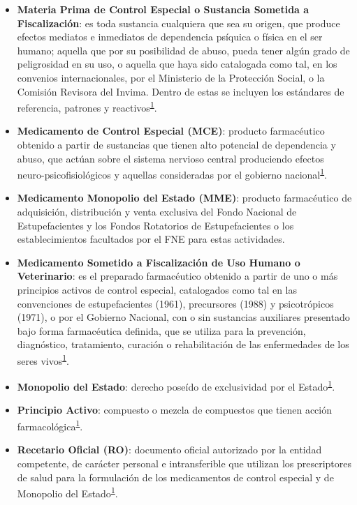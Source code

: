 \documentclass[
]{book}
\begin{document}
\begin{itemize}
\item
  \textbf{Materia Prima de Control Especial o Sustancia Sometida a Fiscalización}: es toda sustancia cualquiera que sea su origen, que produce efectos mediatos e inmediatos de dependencia psíquica o física en el ser humano; aquella que por su posibilidad de abuso, pueda tener algún grado de peligrosidad en su uso, o aquella que haya sido catalogada como tal, en los convenios internacionales, por el Ministerio de la Protección Social, o la Comisión Revisora del Invima. Dentro de estas se incluyen los estándares de referencia, patrones y reactivos\textsuperscript{\protect\hyperlink{ref-MSPS1478-2006}{1}}.
\item
  \textbf{Medicamento de Control Especial (MCE)}: producto farmacéutico obtenido a partir de sustancias que tienen alto potencial de dependencia y abuso, que actúan sobre el sistema nervioso central produciendo efectos neuro-psicofisiológicos y aquellas consideradas por el gobierno nacional\textsuperscript{\protect\hyperlink{ref-MSPS1478-2006}{1}}.
\item
  \textbf{Medicamento Monopolio del Estado (MME)}: producto farmacéutico de adquisición, distribución y venta exclusiva del Fondo Nacional de Estupefacientes y los Fondos Rotatorios de Estupefacientes o los establecimientos facultados por el FNE para estas actividades.
\item
  \textbf{Medicamento Sometido a Fiscalización de Uso Humano o Veterinario}: es el preparado farmacéutico obtenido a partir de uno o más principios activos de control especial, catalogados como tal en las convenciones de estupefacientes (1961), precursores (1988) y psicotrópicos (1971), o por el Gobierno Nacional, con o sin sustancias auxiliares presentado bajo forma farmacéutica definida, que se utiliza para la prevención, diagnóstico, tratamiento, curación o rehabilitación de las enfermedades de los seres vivos\textsuperscript{\protect\hyperlink{ref-MSPS1478-2006}{1}}.
\item
  \textbf{Monopolio del Estado}: derecho poseído de exclusividad por el Estado\textsuperscript{\protect\hyperlink{ref-MSPS1478-2006}{1}}.
\item
  \textbf{Principio Activo}: compuesto o mezcla de compuestos que tienen acción farmacológica\textsuperscript{\protect\hyperlink{ref-MSPS1478-2006}{1}}.
\item
  \textbf{Recetario Oficial (RO)}: documento oficial autorizado por la entidad competente, de carácter personal e intransferible que utilizan los prescriptores de salud para la formulación de los medicamentos de control especial y de Monopolio del Estado\textsuperscript{\protect\hyperlink{ref-MSPS1478-2006}{1}}.

\end{itemize}
\end{document}
